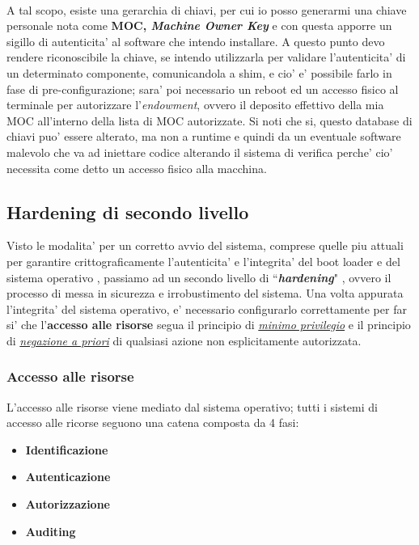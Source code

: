 \\
A tal scopo, esiste una gerarchia di chiavi, per cui io posso generarmi una chiave personale nota come \textbf{MOC, \emph{Machine Owner Key}} e con questa apporre un sigillo di autenticita' al software che intendo installare. A questo punto devo rendere riconoscibile la chiave, se intendo utilizzarla per validare l'autenticita' di un determinato componente, comunicandola a shim, e cio' e' possibile farlo in fase di pre-configurazione; sara' poi necessario un reboot ed un accesso fisico al terminale per autorizzare l'\emph{endowment}, ovvero il deposito effettivo della mia MOC all'interno della lista di MOC autorizzate. Si noti che si, questo database di chiavi puo' essere alterato, ma non a runtime e quindi da un eventuale software malevolo che va ad iniettare codice alterando il sistema di verifica perche' cio' necessita come detto un accesso fisico alla macchina.


\subsection{Hardening di secondo livello}
Visto le modalita' per un corretto avvio del sistema, comprese quelle piu attuali per garantire crittograficamente l'autenticita' e l'integrita' del boot loader e del sistema operativo , passiamo ad un secondo livello di ``\textbf{\emph{hardening}}" , ovvero il processo di messa in sicurezza e irrobustimento del sistema. Una volta appurata l'integrita' del sistema operativo, e' necessario configurarlo correttamente per far si' che l'\textbf{accesso alle risorse} segua il principio di \emph{\underline{minimo privilegio}} e il principio di \emph{\underline{negazione a priori}} di qualsiasi azione non esplicitamente autorizzata.

\subsubsection{Accesso alle risorse}
L'accesso alle risorse viene mediato dal sistema operativo; tutti i sistemi di accesso alle ricorse seguono una catena composta da 4 fasi:
\begin{itemize}
	\item \textbf{Identificazione}
	\item \textbf{Autenticazione}
	\item \textbf{Autorizzazione}
	\item \textbf{Auditing}
\end{itemize}

